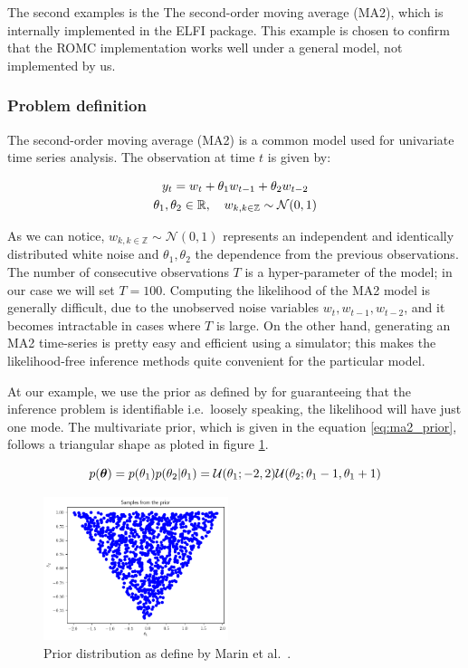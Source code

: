 The second examples is the The second-order moving average (MA2),
which is internally implemented in the ELFI package. This example is
chosen to confirm that the ROMC implementation works well under a
general model, not implemented by us.

\subsubsection*{Problem definition}

The second-order moving average (MA2) is a common model used for
univariate time series analysis. The observation at time $t$ is given by:

\begin{gather} \label{eq:ma2}
y_t = w_t + \theta_1 w_{t-1} + \theta_2 w_{t-2}\\
\theta_1, \theta_2 \in \mathbb{R}, \quad  w_{k, k \in \mathbb{Z}} \sim \mathcal{N}(0,1)
\end{gather}

As we can notice, $w_{k, k \in \mathbb{Z}} \sim \mathcal{N}(0,1)$
represents an independent and identically distributed white noise and
$\theta_1, \theta_2$ the dependence from the previous
observations. The number of consecutive observations $T$ is a
hyper-parameter of the model; in our case we will set
$T=100$. Computing the likelihood of the MA2 model is generally
difficult, due to the unobserved noise variables
$w_t, w_{t-1}, w_{t-2}$, and it becomes intractable in cases where $T$
is large. On the other hand, generating an MA2 time-series is pretty
easy and efficient using a simulator; this makes the likelihood-free
inference methods quite convenient for the particular model.

At our example, we use the prior as defined by \autocite{Marin2012}
for guaranteeing that the inference problem is identifiable i.e.\
loosely speaking, the likelihood will have just one mode. The
multivariate prior, which is given in the equation
\eqref{eq:ma2_prior}, follows a triangular shape as ploted in figure
\ref{fig:ma2_1}.

\begin{equation} \label{eq:ma2_prior}
p(\boldsymbol{\theta}) = p(\theta_1)p(\theta_2|\theta_1)
= \mathcal{U}(\theta_1;-2,2)\mathcal{U}(\theta_2;\theta_1-1, \theta_1+1)
\end{equation}

\begin{figure}[h]
    \begin{center}
      \includegraphics[width=0.48\textwidth]{./Thesis/images/chapter4/mae2_prior_samples.png}
    \end{center}
  \caption{Prior distribution as define by Marin et al.\ \cite{Marin2012}.}
  \label{fig:ma2_1}
\end{figure}

